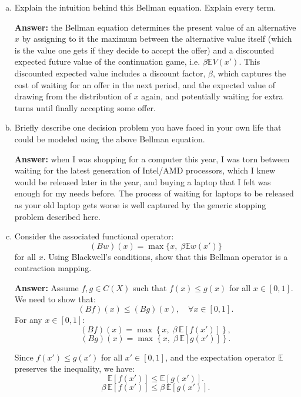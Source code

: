 \documentclass[11pt]{extarticle}
\theoremstyle{plain}
\theoremstyle{definition}
\begin{document}
\vspace{2mm}
\begin{enumerate}[(a)]
\item Explain the intuition behind this Bellman equation. Explain every term.

\textbf{Answer:} the Bellman equation determines the present value of an alternative $x$ by assigning to it the maximum between the alternative value itself (which is the value one gets if they decide to accept the offer) and a discounted expected future value of the continuation game, i.e. $\beta \mathbb E V(x')$. This discounted expected value includes a discount factor, $\beta$, which captures the cost of waiting for an offer in the next period, and the expected value of drawing from the distribution of $x$ again, and potentially waiting for extra turns until finally accepting some offer.
\item Briefly describe one decision problem you have faced in your own life that could be modeled using the above Bellman equation. 

\textbf{Answer:} when I was shopping for a computer this year, I was torn between waiting for the latest generation of Intel/AMD processors, which I knew would be released later in the year, and buying a laptop that I felt was enough for my needs before. The process of waiting for laptops to be released as your old laptop gets worse is well captured by the generic stopping problem described here.

\item Consider the associated functional operator:
\begin{equation*}
	(Bw)(x) = \max \bigg\{ x, \; \beta \mathbb E w(x') \bigg\}
\end{equation*}
for all $x$. Using Blackwell's conditions, show that this Bellman operator is a contraction mapping.

\textbf{Answer:} Assume \( f, g \in C(X) \) such that \( f(x) \leq g(x) \) for all \( x \in [0, 1] \). We need to show that:
\[
(Bf)(x) \leq (Bg)(x), \quad \forall x \in [0, 1].
\]
For any \( x \in [0, 1] \):
\[
(Bf)(x) = \max \left\{ x, \; \beta \, \mathbb{E} \left[ f(x') \right] \right\},
\]
\[
(Bg)(x) = \max \left\{ x, \; \beta \, \mathbb{E} \left[ g(x') \right] \right\}.
\]

Since \( f(x') \leq g(x') \) for all \( x' \in [0,1] \), and the expectation operator \( \mathbb{E} \) preserves the inequality, we have:
\[
\mathbb{E} \left[ f(x') \right] \leq \mathbb{E} \left[ g(x') \right].
\]
\[
\beta \, \mathbb{E} \left[ f(x') \right] \leq \beta \, \mathbb{E} \left[ g(x') \right].
\]


\end{enumerate}
\end{document}
